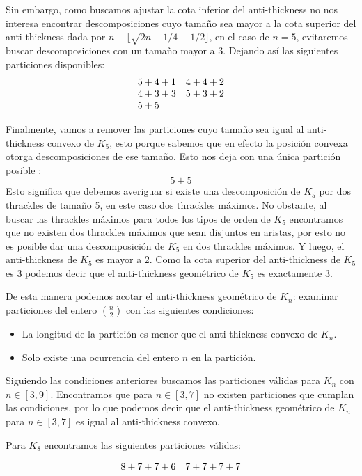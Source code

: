 Sin embargo, como buscamos ajustar la cota inferior del anti-thickness no nos
interesa encontrar descomposiciones cuyo tamaño sea mayor a la cota superior
del anti-thickness dada por $n - \lfloor \sqrt{2n + 1/4} - 1/2 \rfloor$, en el
caso de $n=5$, evitaremos buscar descomposiciones con un tamaño mayor a 3. Dejando
así las siguientes particiones disponibles:
\[
\begin{array}{l l}
  5 + 4 + 1                 & 4 + 4 + 2                                 \\
  4 + 3 + 3                 & 5 + 3 + 2                                 \\
  5 + 5
\end{array}
\]

Finalmente, vamos a remover las particiones cuyo tamaño sea igual al anti-thickness
convexo de $K_5$, esto porque sabemos que en efecto la posición convexa otorga
descomposiciones de ese tamaño. Esto nos deja con una única partición posible :
\[ 5 + 5 \] Esto significa que debemos averiguar si existe una descomposición
de $K_5$ por dos thrackles de tamaño 5, en este caso dos thrackles máximos. No obstante,
al buscar las thrackles máximos para todos los tipos de orden de $K_5$ encontramos
que no existen dos thrackles máximos que sean disjuntos en aristas, por esto no
es posible dar una descomposición de $K_5$ en dos thrackles máximos. Y luego,
el anti-thickness de $K_5$ es mayor a 2. Como la cota superior del anti-thickness
de $K_5$ es 3 podemos decir que el anti-thickness geométrico de $K_5$ es exactamente 3.

De esta manera podemos acotar el anti-thickness geométrico de $K_n$: examinar particiones
del entero $\binom{n}{2}$ con las siguientes condiciones:
\begin{itemize}
  \item La longitud de la partición es menor que el anti-thickness convexo de $K_n$.
  \item Solo existe una ocurrencia del entero $n$ en la partición.
\end{itemize}

Siguiendo las condiciones anteriores buscamos las particiones válidas para $K_n$
con $n\in[3,9]$. Encontramos que para $n\in[3,7]$ no existen particiones que
cumplan las condiciones, por lo que podemos decir que el anti-thickness geométrico
de $K_n$ para $n\in[3,7]$ es igual al anti-thickness convexo.

Para $K_8$ encontramos las siguientes particiones válidas:

\[
\begin{array}{l l}
8 + 7 + 7 + 6 & 7 + 7 + 7 + 7
\end{array}
\]

